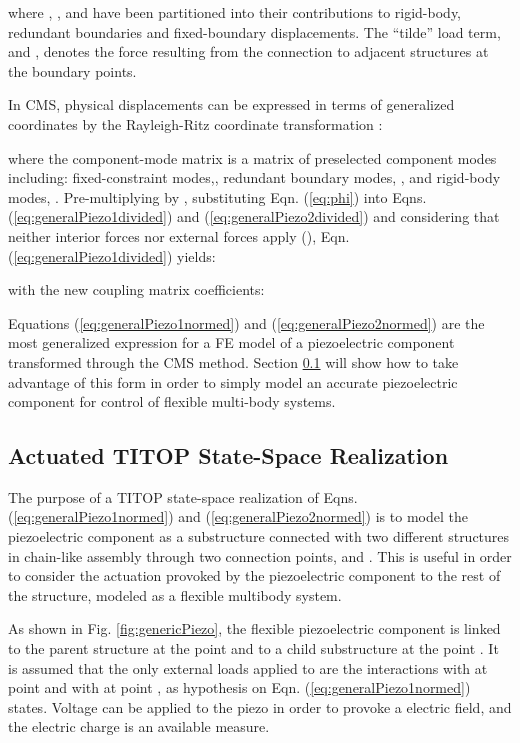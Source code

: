\documentclass{ifacconf}
\begin{document}
\normalsize

where , ,  and   have been partitioned into their contributions to rigid-body, redundant boundaries and fixed-boundary displacements. The ``tilde'' load term,  and , denotes the force resulting from the connection to adjacent structures at the boundary points.

In CMS, physical displacements can be expressed in terms of generalized coordinates by the Rayleigh-Ritz coordinate transformation \cite{Craig2000_CB}:



where the component-mode matrix  is a matrix of preselected
component modes including: fixed-constraint modes,,
redundant boundary modes, , and rigid-body modes, . Pre-multiplying by , substituting Eqn. (\ref{eq:phi}) into Eqns.  (\ref{eq:generalPiezo1divided}) and (\ref{eq:generalPiezo2divided}) and considering that neither interior forces nor external forces apply (), Eqn. (\ref{eq:generalPiezo1divided}) yields:

\small



\normalsize

with the new coupling matrix coefficients:




Equations (\ref{eq:generalPiezo1normed}) and (\ref{eq:generalPiezo2normed}) are the most generalized expression for a FE model of a piezoelectric component transformed through the CMS method. Section \ref{subsec:SS} will show how to take advantage of this form in order to simply model an accurate piezoelectric component for control of flexible multi-body systems.

\subsection{Actuated TITOP State-Space Realization}
\label{subsec:SS}

The purpose of a TITOP state-space realization of Eqns. (\ref{eq:generalPiezo1normed}) and (\ref{eq:generalPiezo2normed}) is to model the piezoelectric component as a substructure connected with two different structures in chain-like assembly through two connection points,  and . This is useful in order to consider the actuation provoked by the piezoelectric component to the rest of the structure, modeled as a flexible multibody system.

As shown in Fig. \ref{fig:genericPiezo}, the flexible piezoelectric component  is linked to the parent structure  at the point  and to a child substructure  at the point . It is assumed that the only external loads applied to  are the interactions  with   at point  and with  at point , as hypothesis on Eqn. (\ref{eq:generalPiezo1normed}) states. Voltage  can be applied to the piezo in order to provoke a electric field, and the electric charge  is an available measure.
\end{document}
